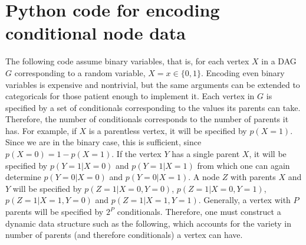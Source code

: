 \section*{Python code for encoding conditional node data}

\null \quad \quad The following code assume binary variables, that is, for each vertex $X$ in a DAG $G$ corresponding to a random variable, $X = x \in \{0,1\}.$ Encoding even binary variables is expensive and nontrivial, but the same arguments can be extended to categoricals for those patient enough to implement it. \newline
\null \quad \quad Each vertex in $G$ is specified by a set of conditionals corresponding to the values its parents can take. Therefore, the number of conditionals corresponds to the number of parents it has. For example, if $X$ is a parentless vertex, it will be specified by $p(X=1)$. Since we are in the binary case, this is sufficient, since $p(X=0) = 1-p(X=1)$.\newline
\null \quad \quad If the vertex $Y$ has a single parent $X$, it will be specified by $p(Y=1|X=0)$ and $p(Y=1|X=1)$ from which one can again determine $p(Y=0|X=0)$ and $p(Y=0|X=1)$. A node $Z$ with parents $X$ and $Y$ will be specified by $p(Z=1|X=0,Y=0)$, $p(Z=1|X=0,Y=1)$, $p(Z=1|X=1,Y=0)$ and $p(Z=1|X=1,Y=1)$. Generally, a vertex with $P$ parents will be specified by $2^{P}$ conditionals. Therefore, one must construct a dynamic data structure such as the following, which accounts for the variety in number of parents (and therefore conditionals) a vertex can have. 

